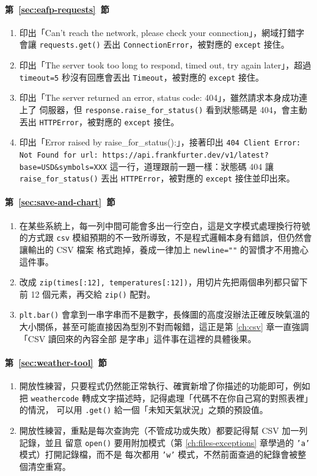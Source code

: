 \paragraph{第~\ref{sec:eafp-requests}~節}
\begin{enumerate}
\item 印出「Can't reach the network, please check your connection」，網域打錯字會讓
\texttt{requests.get()} 丟出 \texttt{ConnectionError}，被對應的 \texttt{except} 接住。
\item 印出「The server took too long to respond, timed out, try again later」，超過
\texttt{timeout=5} 秒沒有回應會丟出 \texttt{Timeout}，被對應的 \texttt{except} 接住。
\item 印出「The server returned an error, status code: 404」，雖然請求本身成功連上了
伺服器，但 \texttt{response.raise\_for\_status()} 看到狀態碼是 404，會主動丟出
\texttt{HTTPError}，被對應的 \texttt{except} 接住。
\item 印出「Error raised by raise\_for\_status():」，接著印出
\texttt{404 Client Error: Not Found for url: https://api.frankfurter.dev/v1/latest?base=USD\&symbols=XXX}
這一行，道理跟前一題一樣：狀態碼 404 讓 \texttt{raise\_for\_status()} 丟出
\texttt{HTTPError}，被對應的 \texttt{except} 接住並印出來。
\end{enumerate}

\paragraph{第~\ref{sec:save-and-chart}~節}
\begin{enumerate}
\item 在某些系統上，每一列中間可能會多出一行空白，這是文字模式處理換行符號的方式跟
\texttt{csv} 模組預期的不一致所導致，不是程式邏輯本身有錯誤，但仍然會讓輸出的 CSV 檔案
格式跑掉，養成一律加上 \texttt{newline=""} 的習慣才不用擔心這件事。
\item 改成 \texttt{zip(times[:12], temperatures[:12])}，用切片先把兩個串列都只留下前
12 個元素，再交給 \texttt{zip()} 配對。
\item \texttt{plt.bar()} 會拿到一串字串而不是數字，長條圖的高度沒辦法正確反映氣溫的
大小關係，甚至可能直接因為型別不對而報錯，這正是第 \ref{ch:csv} 章一直強調「CSV 讀回來的內容全部
是字串」這件事在這裡的具體後果。
\end{enumerate}

\paragraph{第~\ref{sec:weather-tool}~節}
\begin{enumerate}
\item 開放性練習，只要程式仍然能正常執行、確實新增了你描述的功能即可，例如把
\texttt{weathercode} 轉成文字描述時，記得處理「代碼不在你自己寫的對照表裡」的情況，
可以用 \texttt{.get()} 給一個「未知天氣狀況」之類的預設值。
\item 開放性練習，重點是每次查詢完（不管成功或失敗）都要記得幫 CSV 加一列記錄，並且
留意 \texttt{open()} 要用附加模式（第 \ref{ch:files-exceptions} 章學過的 \texttt{'a'} 模式）打開記錄檔，而不是
每次都用 \texttt{'w'} 模式，不然前面查過的紀錄會被整個清空重寫。
\end{enumerate}
